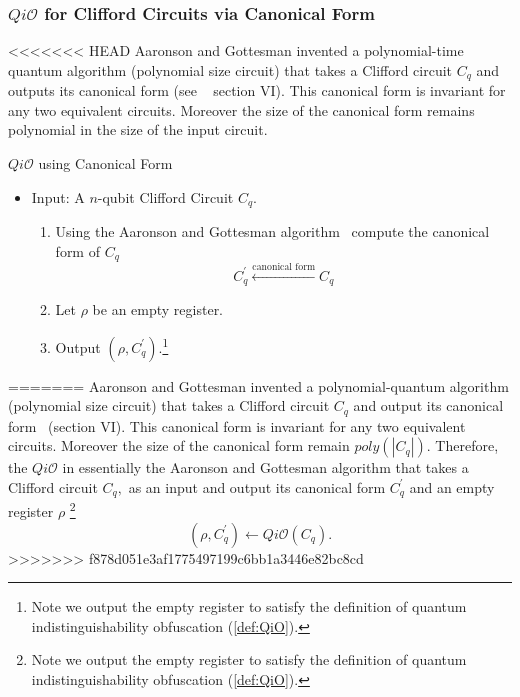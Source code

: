 \subsubsection{$Qi\mathcal{O}$ for Clifford Circuits via Canonical Form}
\label{sec:Clifford-iO-canonical}
<<<<<<< HEAD
Aaronson and Gottesman invented a polynomial-time quantum algorithm (polynomial size circuit) that takes a Clifford circuit $C_q$ and outputs its canonical form (see ~\cite{AG04} section VI). This canonical form is invariant for any two equivalent circuits. Moreover the size of the canonical form remains polynomial in the size of the input circuit. 
\begin{algorithm}[H]
\label{QiO:Canonical-Clifford}
   \caption{$Qi\mathcal{O}$ using Canonical Form}
  \begin{itemize}
\item Input: A $n$-qubit Clifford Circuit $C_q.$
 \begin{enumerate}
  \item   Using  the Aaronson and Gottesman algorithm~\cite{AG04} compute the canonical form of $C_q$
   		\begin{equation*}
 		 C_q^\prime \xleftarrow{\mbox{canonical form}}C_q
 		 \end{equation*}
  \item Let $\rho$ be an empty register.
  \item Output $\left(\rho,C_q^\prime \right).$\footnote{Note we output the empty register to satisfy the definition of quantum indistinguishability obfuscation (\ref{def:QiO}).}
  \end{enumerate}
  \end{itemize}
\end{algorithm}


=======
Aaronson and Gottesman invented a polynomial-quantum algorithm (polynomial size circuit) that takes a Clifford circuit $C_q$ and output its canonical form~\cite{AG04} (section VI). This canonical form is invariant for any two equivalent circuits. Moreover the size of the canonical form remain $poly(|C_q|).$ Therefore, the $Qi\mathcal{O}$ in essentially the Aaronson and Gottesman algorithm that takes a Clifford circuit $C_q,$ as an input and output its canonical form $C_q^\prime$ and an empty register $\rho$ \footnote{Note we output the empty register to satisfy the definition of quantum indistinguishability obfuscation (\ref{def:QiO}).}
														$$(\rho, C_q^\prime)\leftarrow Qi\mathcal{O}(C_q).$$
>>>>>>> f878d051e3af1775497199c6bb1a3446e82bc8cd

